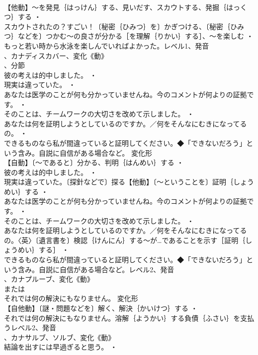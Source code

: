 \documentclass[8pt]{extreport}
\begin{document}
\begin{CJK}{UTF8}{min}
\\	【他動】～を発見｛はっけん｝する、見いだす、スカウトする、発掘｛はっくつ｝する ・
\\	スカウトされたの？すごい！〔秘密｛ひみつ｝を〕かぎつける、〔秘密｛ひみつ｝などを〕つかむ～の良さが分かる［を理解｛りかい｝する］、～を楽しむ ・
\\	もっと若い時から水泳を楽しんでいればよかった。レベル1、発音
\\	、カナディスカバー、変化《動》
\\	、分節
\\	彼の考えは的中しました。 ・
\\	現実は違っていた。 ・
\\	あなたは医学のことが何も分かっていませんね。今のコメントが何よりの証拠です。 ・
\\	そのことは、チームワークの大切さを改めて示しました。 ・
\\	あなたは何を証明しようとしているのですか。／何をそんなにむきになってるの。 ・
\\	できるものなら私が間違っていると証明してください。◆「できないだろう」という含み。自説に自信がある場合など。	変化形 
\\	【自動】〔～であると〕分かる、判明｛はんめい｝する ・
\\	彼の考えは的中しました。 ・
\\	現実は違っていた。〔探針などで〕探る【他動】〔～ということを〕証明｛しょうめい｝する ・
\\	あなたは医学のことが何も分かっていませんね。今のコメントが何よりの証拠です。 ・
\\	そのことは、チームワークの大切さを改めて示しました。 ・
\\	あなたは何を証明しようとしているのですか。／何をそんなにむきになってるの。〈英〉〔遺言書を〕検認｛けんにん｝する～が…であることを示す［証明｛しょうめい｝する］ ・
\\	できるものなら私が間違っていると証明してください。◆「できないだろう」という含み。自説に自信がある場合など。レベル2、発音
\\	、カナプルーブ、変化《動》
\\	または
\\	それでは何の解決にもなりません。	変化形 
\\	【自他動】〔謎・問題などを〕解く、解決｛かいけつ｝する ・
\\	それでは何の解決にもなりません。溶解｛ようかい｝する負債｛ふさい｝を支払うレベル2、発音
\\	、カナサルブ、ソルブ、変化《動》
\\	結論を出すには早過ぎると思う。 ・

\end{CJK}
\end{document}
